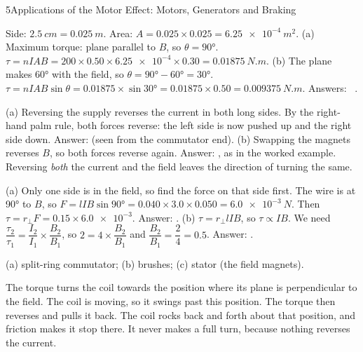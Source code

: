 \begin{chapteranswers}{5}{Applications of the Motor Effect: Motors, Generators and Braking}
  \item Side: $\qty{2.5}{cm} = \qty{0.025}{m}$. Area:
        $A = 0.025 \times 0.025 = \qty{6.25e-4}{m^2}$.
        (a) Maximum torque: plane parallel to $B$, so $\theta = \ang{90}$.
        $\tau = nIAB = 200 \times 0.50 \times \num{6.25e-4} \times 0.30 = \qty{0.01875}{N.m}$.
        (b) The plane makes \ang{60} with the field, so
        $\theta = \ang{90} - \ang{60} = \ang{30}$.
        $\tau = nIAB\sin\theta = 0.01875 \times \sin\ang{30} = 0.01875 \times 0.50
        = \qty{0.009375}{N.m}$.
        Answers:  \ .
  \item (a) Reversing the supply reverses the current in both long sides. By the
        right-hand palm rule, both forces reverse: the left side is now pushed up and
        the right side down. Answer:  (seen from the commutator end).
        (b) Swapping the magnets reverses $B$, so both forces reverse again. Answer:
        , as in the worked example. Reversing \emph{both} the
        current and the field leaves the direction of turning the same.
  \item (a) Only one side is in the field, so find the force on that side first. The
        wire is at \ang{90} to $B$, so
        $F = lIB\sin\ang{90} = 0.040 \times 3.0 \times 0.050 = \qty{6.0e-3}{N}$.
        Then $\tau = r_\perp F = 0.15 \times \num{6.0e-3}$.
        Answer: .
        (b) $\tau = r_\perp lIB$, so $\tau \propto IB$. We need
        $\dfrac{\tau_2}{\tau_1} = \dfrac{I_2}{I_1} \times \dfrac{B_2}{B_1}$, so
        $2 = 4 \times \dfrac{B_2}{B_1}$ and $\dfrac{B_2}{B_1} = \dfrac{2}{4} = 0.5$.
        Answer: .
  \item (a) split-ring commutator; (b) brushes; (c) stator (the field magnets).
  \item The torque turns the coil towards the position where its plane is
        perpendicular to the field. The coil is moving, so it swings past this
        position. The torque then reverses and pulls it back. The coil rocks back and
        forth about that position, and friction makes it stop there. It never makes
        a full turn, because nothing reverses the current.

\end{chapteranswers}
